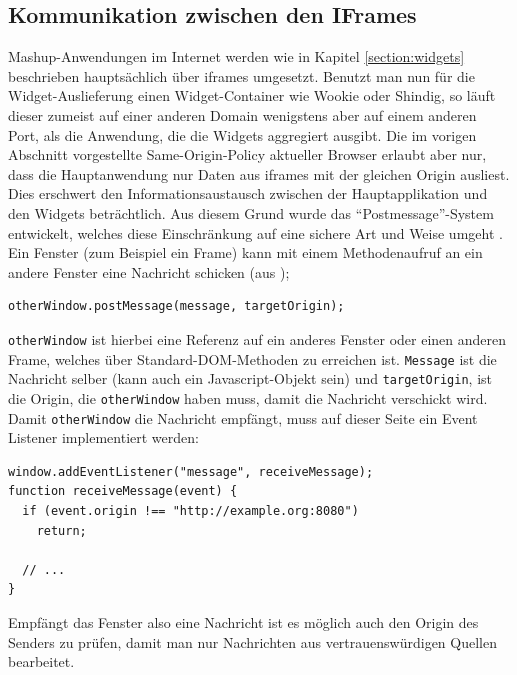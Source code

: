 \subsection{Kommunikation zwischen den IFrames}\label{section:kommunikation_zwischen_iframes}
Mashup-Anwendungen im Internet werden wie in Kapitel \ref{section:widgets} beschrieben hauptsächlich über iframes umgesetzt. Benutzt man nun für die Widget-Auslieferung einen Widget-Container wie Wookie oder Shindig, so läuft dieser zumeist auf einer anderen Domain wenigstens aber auf einem anderen Port, als die Anwendung, die die Widgets aggregiert ausgibt. Die im vorigen Abschnitt vorgestellte Same-Origin-Policy aktueller Browser erlaubt aber nur, dass die Hauptanwendung nur Daten aus iframes mit der gleichen Origin ausliest. Dies erschwert den Informationsaustausch zwischen der Hauptapplikation und den Widgets beträchtlich. Aus diesem Grund wurde das "`Postmessage"'-System entwickelt, welches diese Einschränkung auf eine sichere Art und Weise umgeht \cite{postmessage_mozilla}. Ein Fenster (zum Beispiel ein Frame) kann mit einem Methodenaufruf an ein andere Fenster eine Nachricht schicken (aus \cite{postmessage_mozilla});
\begin{lstlisting}
otherWindow.postMessage(message, targetOrigin);
\end{lstlisting}
\texttt{otherWindow} ist hierbei eine Referenz auf ein anderes Fenster oder einen anderen Frame, welches über Standard-DOM-Methoden zu erreichen ist. \texttt{Message} ist die Nachricht selber (kann auch ein Javascript-Objekt sein) und \texttt{targetOrigin}, ist die Origin, die \texttt{otherWindow} haben muss, damit die Nachricht verschickt wird. Damit \texttt{otherWindow} die Nachricht empfängt, muss auf dieser Seite ein Event Listener implementiert werden:
\begin{lstlisting}
window.addEventListener("message", receiveMessage);
function receiveMessage(event) {
  if (event.origin !== "http://example.org:8080")
    return;
 
  // ...
}
\end{lstlisting}
Empfängt das Fenster also eine Nachricht ist es möglich auch den Origin des Senders zu prüfen, damit man nur Nachrichten aus vertrauenswürdigen Quellen bearbeitet.

